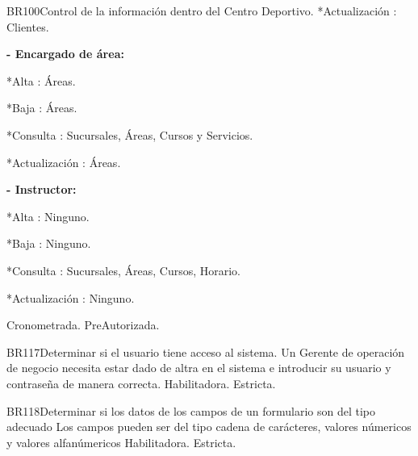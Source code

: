 \begin{BussinesRule}{BR100}{Control de la información dentro del Centro Deportivo.}
	*Actualización : Clientes.

{\bf- Encargado de área:}
	
	*Alta : Áreas.
	
	*Baja : Áreas.
	
	*Consulta : Sucursales, Áreas, Cursos y Servicios.
	
	*Actualización : Áreas.

{\bf- Instructor:}
	
	*Alta : Ninguno.
	
	*Baja : Ninguno.
	
	*Consulta : Sucursales, Áreas, Cursos, Horario.
	
	*Actualización : Ninguno.


	\BRitem[Tipo:] Cronometrada.
	\BRitem[Nivel:] PreAutorizada.
\end{BussinesRule}


\begin{BussinesRule}{BR117}{Determinar si el usuario tiene acceso al sistema.} 
	\BRitem[Descripción:] Un Gerente de operación de negocio necesita estar dado de altra en el sistema e introducir su usuario y contraseña de manera correcta.
	\BRitem[Tipo:] Habilitadora.
	\BRitem[Nivel:] Estricta.
\end{BussinesRule}

\begin{BussinesRule}{BR118}{Determinar si los datos de los campos de un formulario son del tipo adecuado} 
	\BRitem[Descripción:] Los campos pueden ser del tipo cadena de carácteres, valores númericos y valores alfanúmericos
	\BRitem[Tipo:] Habilitadora.
	\BRitem[Nivel:] Estricta.
\end{BussinesRule}


